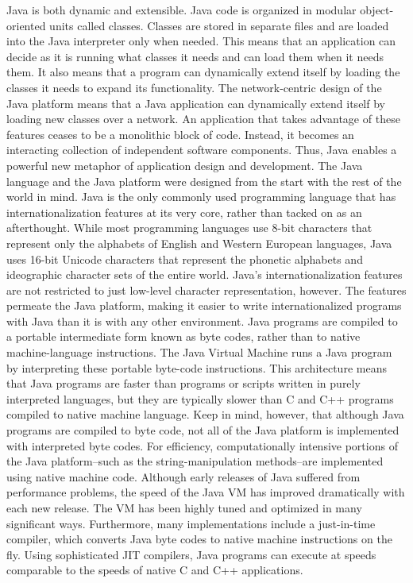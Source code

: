 \documentclass[a4paper,11pt]{IEEEtran}
\begin{document}
{Java is both dynamic and extensible. Java code is organized in modular object-oriented units called classes. Classes are stored in separate files and are loaded into the Java interpreter only when needed. This means that an application can decide as it is running what classes it needs and can load them when it needs them. It also means that a program can dynamically extend itself by loading the classes it needs to expand its functionality.
The network-centric design of the Java platform means that a Java application can dynamically extend itself by loading new classes over a network. An application that takes advantage of these features ceases to be a monolithic block of code. Instead, it becomes an interacting collection of independent software components. Thus, Java enables a powerful new metaphor of application design and development.
The Java language and the Java platform were designed from the start with the rest of the world in mind. Java is the only commonly used programming language that has internationalization features at its very core, rather than tacked on as an afterthought. While most programming languages use 8-bit characters that represent only the alphabets of English and Western European languages, Java uses 16-bit Unicode characters that represent the phonetic alphabets and ideographic character sets of the entire world. Java's internationalization features are not restricted to just low-level character representation, however. The features permeate the Java platform, making it easier to write internationalized programs with Java than it is with any other environment.
 Java programs are compiled to a portable intermediate form known as byte codes, rather than to native machine-language instructions. The Java Virtual Machine runs a Java program by interpreting these portable byte-code instructions. This architecture means that Java programs are faster than programs or scripts written in purely interpreted languages, but they are typically slower than C and C++ programs compiled to native machine language. Keep in mind, however, that although Java programs are compiled to byte code, not all of the Java platform is implemented with interpreted byte codes. For efficiency, computationally intensive portions of the Java platform--such as the string-manipulation methods--are implemented using native machine code.
Although early releases of Java suffered from performance problems, the speed of the Java VM has improved dramatically with each new release. The VM has been highly tuned and optimized in many significant ways. Furthermore, many implementations include a just-in-time compiler, which converts Java byte codes to native machine instructions on the fly. Using sophisticated JIT compilers, Java programs can execute at speeds comparable to the speeds of native C and C++ applications.
}
\end{document}
